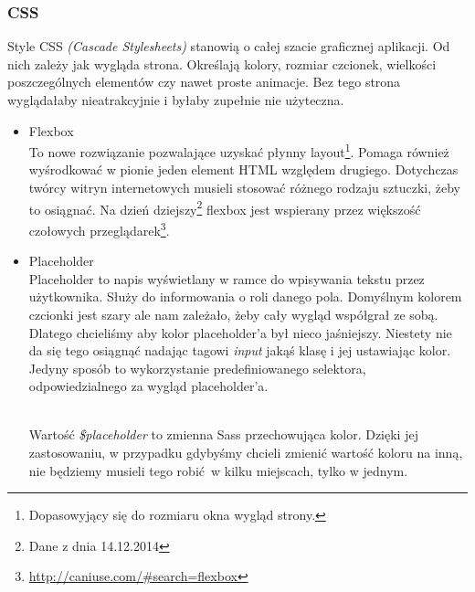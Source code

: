       \subsubsection{CSS}
        Style CSS \emph{(Cascade Stylesheets)} stanowią o całej szacie graficznej aplikacji. Od nich zależy jak wygląda strona. Określają kolory, rozmiar czcionek, wielkości poszczególnych elementów czy nawet proste animacje. Bez tego strona wyglądałaby nieatrakcyjnie i byłaby zupełnie nie użyteczna.
        \begin{itemize}
          \item Flexbox\\
            To nowe rozwiązanie pozwalające uzyskać płynny layout\footnote{Dopasowyjący się do rozmiaru okna wygląd strony.}. Pomaga również wyśrodkować w pionie jeden element HTML względem drugiego. Dotychczas twórcy witryn internetowych musieli stosować różnego rodzaju sztuczki, żeby to osiągnać. Na dzień dziejszy\footnote{Dane z dnia 14.12.2014} flexbox jest wspierany przez większość czołowych przeglądarek\footnote{\url{http://caniuse.com/\#search=flexbox}}. \\
            
            \clearpage
          \item Placeholder\\
            Placeholder to napis wyświetlany w ramce do wpisywania tekstu przez użytkownika. Służy do informowania o roli danego pola. Domyślnym kolorem czcionki jest szary ale nam zależało, żeby cały wygląd współgrał ze sobą. Dlatego chcieliśmy aby kolor placeholder'a był nieco jaśniejszy. Niestety nie da się tego osiągnąć nadając tagowi \emph{input} jakąś klasę i jej ustawiając kolor. Jedyny sposób to wykorzystanie predefiniowanego selektora, odpowiedzialnego za wygląd placeholder'a.

            \begin{code}
              
            \end{code}\\

            Wartość \emph{\$placeholder} to zmienna Sass przechowująca kolor. Dzięki jej zastosowaniu, w przypadku gdybyśmy chcieli zmienić wartość koloru na inną, nie będziemy musieli tego robić w kilku miejscach, tylko w jednym.


\end{itemize}
